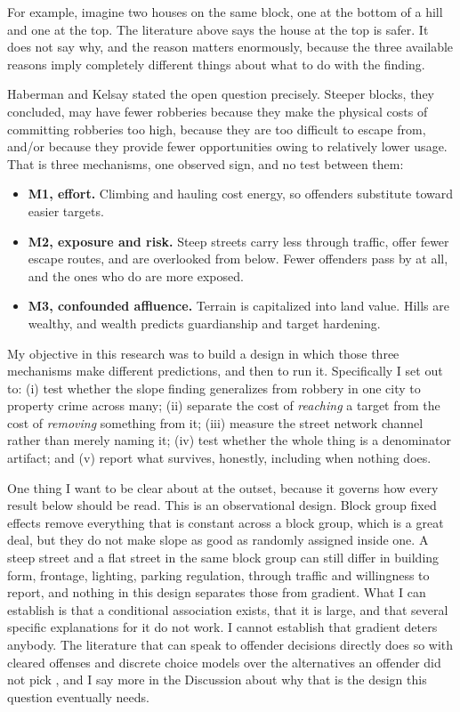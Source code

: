\documentclass[10pt,letterpaper]{article}
\begin{document}
For example, imagine two houses on the same block, one at the bottom of a hill and
one at the top. The literature above says the house at the top is safer. It does not
say why, and the reason matters enormously, because the three available reasons imply
completely different things about what to do with the finding.

Haberman and Kelsay stated the open question precisely. Steeper blocks, they
concluded, may have fewer robberies because they make the physical costs of
committing robberies too high, because they are too difficult to escape from, and/or
because they provide fewer opportunities owing to relatively lower usage. That is
three mechanisms, one observed sign, and no test between them:

\begin{itemize}
\item \textbf{M1, effort.} Climbing and hauling cost energy, so offenders substitute
toward easier targets.
\item \textbf{M2, exposure and risk.} Steep streets carry less through traffic, offer
fewer escape routes, and are overlooked from below. Fewer offenders pass by at all,
and the ones who do are more exposed.
\item \textbf{M3, confounded affluence.} Terrain is capitalized into land value.
Hills are wealthy, and wealth predicts guardianship and target hardening.
\end{itemize}

My objective in this research was to build a design in which those three mechanisms
make different predictions, and then to run it. Specifically I set out to: (i) test
whether the slope finding generalizes from robbery in one city to property crime
across many; (ii) separate the cost of \emph{reaching} a target from the cost of
\emph{removing} something from it; (iii) measure the street network channel rather
than merely naming it; (iv) test whether the whole thing is a denominator artifact;
and (v) report what survives, honestly, including when nothing does.

One thing I want to be clear about at the outset, because it governs how every
result below should be read. This is an observational design. Block group fixed
effects remove everything that is constant across a block group, which is a great
deal, but they do not make slope as good as randomly assigned inside one. A steep
street and a flat street in the same block group can still differ in building form,
frontage, lighting, parking regulation, through traffic and willingness to report,
and nothing in this design separates those from gradient. What I can establish is
that a conditional association exists, that it is large, and that several specific
explanations for it do not work. I cannot establish that gradient deters anybody.
The literature that can speak to offender decisions directly does so with cleared
offenses and discrete choice models over the alternatives an offender did not pick
\cite{frith2017,johnsonsummers2015,clare2009}, and I say more in the Discussion
about why that is the design this question eventually needs.
\end{document}
